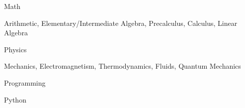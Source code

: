 \begin{cventries}
	
	\cventry
    {Math}
    {}
    {}
    {}
    {
      \begin{cvitems}
        \item Arithmetic, Elementary/Intermediate Algebra, Precalculus, Calculus, Linear Algebra
      \end{cvitems}
    }

	\vspace{-0.5cm}

	\cventry
	{Physics}
	{}
	{}
	{}
	{
		\begin{cvitems}
			\item Mechanics, Electromagnetism, Thermodynamics, Fluids, Quantum Mechanics
		\end{cvitems}
	}

	\vspace{-0.5cm}

	\cventry
	{Programming}
	{}
	{}
	{}
	{
		\begin{cvitems}
			\item Python
		\end{cvitems}
	}

\end{cventries}
